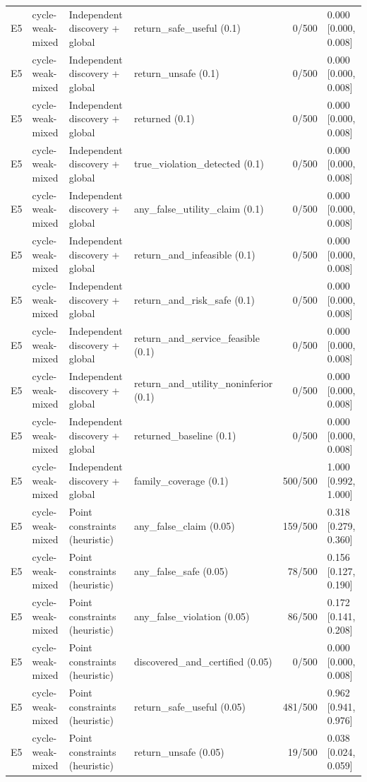 \begin{longtable}{p{.04\linewidth}p{.18\linewidth}p{.19\linewidth}p{.16\linewidth}r p{.21\linewidth}}
E5 & cycle-weak-mixed & Independent discovery + global & return\_safe\_useful (0.1) & 0/500 & 0.000 [0.000, 0.008]\\
E5 & cycle-weak-mixed & Independent discovery + global & return\_unsafe (0.1) & 0/500 & 0.000 [0.000, 0.008]\\
E5 & cycle-weak-mixed & Independent discovery + global & returned (0.1) & 0/500 & 0.000 [0.000, 0.008]\\
E5 & cycle-weak-mixed & Independent discovery + global & true\_violation\_detected (0.1) & 0/500 & 0.000 [0.000, 0.008]\\
E5 & cycle-weak-mixed & Independent discovery + global & any\_false\_utility\_claim (0.1) & 0/500 & 0.000 [0.000, 0.008]\\
E5 & cycle-weak-mixed & Independent discovery + global & return\_and\_infeasible (0.1) & 0/500 & 0.000 [0.000, 0.008]\\
E5 & cycle-weak-mixed & Independent discovery + global & return\_and\_risk\_safe (0.1) & 0/500 & 0.000 [0.000, 0.008]\\
E5 & cycle-weak-mixed & Independent discovery + global & return\_and\_service\_feasible (0.1) & 0/500 & 0.000 [0.000, 0.008]\\
E5 & cycle-weak-mixed & Independent discovery + global & return\_and\_utility\_noninferior (0.1) & 0/500 & 0.000 [0.000, 0.008]\\
E5 & cycle-weak-mixed & Independent discovery + global & returned\_baseline (0.1) & 0/500 & 0.000 [0.000, 0.008]\\
E5 & cycle-weak-mixed & Independent discovery + global & family\_coverage (0.1) & 500/500 & 1.000 [0.992, 1.000]\\
E5 & cycle-weak-mixed & Point constraints (heuristic) & any\_false\_claim (0.05) & 159/500 & 0.318 [0.279, 0.360]\\
E5 & cycle-weak-mixed & Point constraints (heuristic) & any\_false\_safe (0.05) & 78/500 & 0.156 [0.127, 0.190]\\
E5 & cycle-weak-mixed & Point constraints (heuristic) & any\_false\_violation (0.05) & 86/500 & 0.172 [0.141, 0.208]\\
E5 & cycle-weak-mixed & Point constraints (heuristic) & discovered\_and\_certified (0.05) & 0/500 & 0.000 [0.000, 0.008]\\
E5 & cycle-weak-mixed & Point constraints (heuristic) & return\_safe\_useful (0.05) & 481/500 & 0.962 [0.941, 0.976]\\
E5 & cycle-weak-mixed & Point constraints (heuristic) & return\_unsafe (0.05) & 19/500 & 0.038 [0.024, 0.059]\\

\end{longtable}

